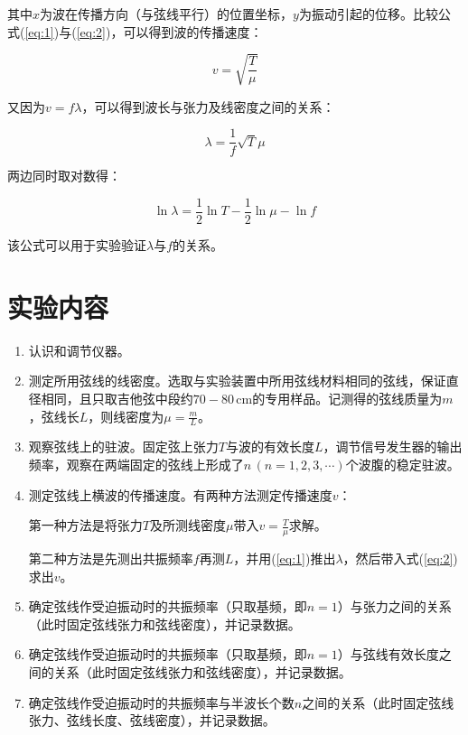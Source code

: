 \documentclass[12pt]{article}
\begin{document}
其中$x$为波在传播方向（与弦线平行）的位置坐标，$y$为振动引起的位移。比较公式(\ref{eq:1})与(\ref{eq:2})，可以得到波的传播速度：

\begin{equation}\label{eq:3}
    v=\sqrt{\frac{T}{\mu}}
\end{equation}

又因为$v=f\lambda$，可以得到波长与张力及线密度之间的关系：

\begin{equation}\label{eq:4}
    \lambda=\frac{1}{f}\sqrt{T}{\mu}
\end{equation}

两边同时取对数得：

\begin{equation}\label{eq:5}
    \ln\lambda=\frac{1}{2}\ln T - \frac{1}{2}\ln\mu-\ln f
\end{equation}

该公式可以用于实验验证$\lambda$与$f$的关系。

\section{实验内容}

\begin{enumerate}
    \item 认识和调节仪器。
    \item 测定所用弦线的线密度。选取与实验装置中所用弦线材料相同的弦线，保证直径相同，且只取吉他弦中段约$70-80\,\mathrm{cm}$的专用样品。记测得的弦线质量为$m$，弦线长$L$，则线密度为$\mu=\frac{m}{L}$。
    \item 观察弦线上的驻波。固定弦上张力$ T $与波的有效长度$ L $，调节信号发生器的输出频率，观察在两端固定的弦线上形成了$n\,(n=1,2,3,\cdots) $个波腹的稳定驻波。
    \item 测定弦线上横波的传播速度。有两种方法测定传播速度$v$：
    
    第一种方法是将张力$T$及所测线密度$\mu$带入$v=\frac{T}{\mu}$求解。

    第二种方法是先测出共振频率$f$再测$L$，并用(\ref{eq:1})推出$\lambda$，然后带入式(\ref{eq:2})求出$v$。
    \item 确定弦线作受迫振动时的共振频率（只取基频，即$n=1$）与张力之间的关系（此时固定弦线张力和弦线密度），并记录数据。
    \item 确定弦线作受迫振动时的共振频率（只取基频，即$n=1$）与弦线有效长度之间的关系（此时固定弦线张力和弦线密度），并记录数据。
    \item 确定弦线作受迫振动时的共振频率与半波长个数$n$之间的关系（此时固定弦线张力、弦线长度、弦线密度），并记录数据。
\end{enumerate}
\end{document}

